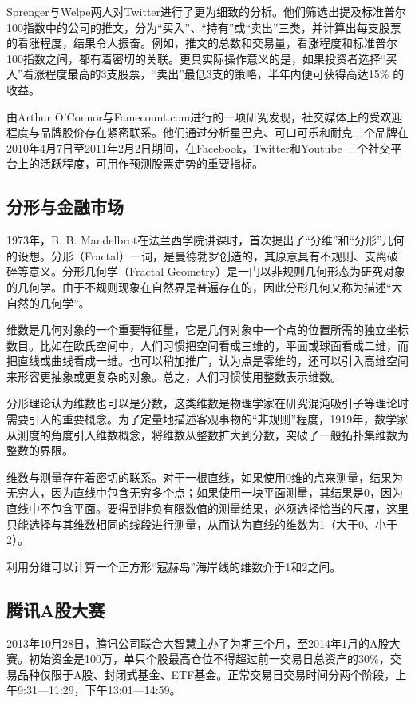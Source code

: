 Sprenger与Welpe两人对Twitter进行了更为细致的分析\cite{sprenger2010tweets}。他们筛选出提及标准普尔100指数中的公司的推文，分为“买入”、“持有”或“卖出”三类，并计算出每支股票的看涨程度，结果令人振奋。例如，推文的总数和交易量，看涨程度和标准普尔100指数之间，都有着密切的关联。更具实际操作意义的是，如果投资者选择“买入”看涨程度最高的3支股票，“卖出”最低3支的策略，半年内便可获得高达15\% 的收益。

由Arthur O’Connor与Famecount.com进行的一项研究发现，社交媒体上的受欢迎程度与品牌股价存在紧密联系。他们通过分析星巴克、可口可乐和耐克三个品牌在2010年4月7日至2011年2月2日期间，在Facebook，Twitter和Youtube 三个社交平台上的活跃程度，可用作预测股票走势的重要指标。

\subsection{分形与金融市场}
1973年，B. B. Mandelbrot在法兰西学院讲课时，首次提出了“分维”和“分形”几何的设想。分形（Fractal）一词，是曼德勃罗创造的，其原意具有不规则、支离破碎等意义。分形几何学（Fractal Geometry）是一门以非规则几何形态为研究对象的几何学。由于不规则现象在自然界是普遍存在的，因此分形几何又称为描述“大自然的几何学”。

维数是几何对象的一个重要特征量，它是几何对象中一个点的位置所需的独立坐标数目。比如在欧氏空间中，人们习惯把空间看成三维的，平面或球面看成二维，而把直线或曲线看成一维。也可以稍加推广，认为点是零维的，还可以引入高维空间来形容更抽象或更复杂的对象。总之，人们习惯使用整数表示维数。

分形理论认为维数也可以是分数，这类维数是物理学家在研究混沌吸引子等理论时需要引入的重要概念。为了定量地描述客观事物的“非规则”程度，1919年，数学家从测度的角度引入维数概念，将维数从整数扩大到分数，突破了一般拓扑集维数为整数的界限。

维数与测量存在着密切的联系。对于一根直线，如果使用0维的点来测量，结果为无穷大，因为直线中包含无穷多个点；如果使用一块平面测量，其结果是0，因为直线中不包含平面。要得到非负有限数值的测量结果，必须选择恰当的尺度，这里只能选择与其维数相同的线段进行测量，从而认为直线的维数为1（大于0、小于2）。

利用分维可以计算一个正方形“寇赫岛”海岸线的维数介于1和2之间。

\subsection{腾讯A股大赛}
2013年10月28日，腾讯公司联合大智慧主办了为期三个月，至2014年1月的A股大赛。初始资金是100万，单只个股最高仓位不得超过前一交易日总资产的30\%，交易品种仅限于A股、封闭式基金、ETF基金。正常交易日交易时间分两个阶段，上午9:31—11:29，下午13:01—14:59。


